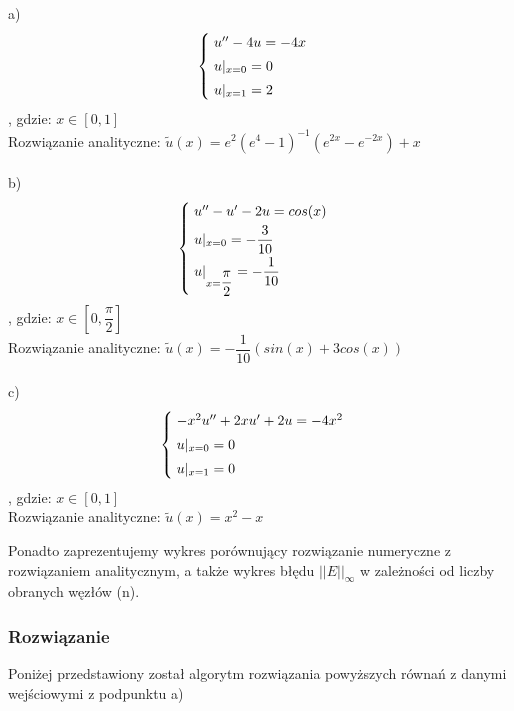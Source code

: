 a)
\[
\begin{cases}
\vspace{0.1cm} 
\hspace{0,1cm} u'' - 4u =-4x \\
\vspace{0.1cm}
\hspace{0,1cm}u|_{x=0} = 0 \\
\hspace{0,1cm}u|_{x=1} = 2
\end{cases}
\]
, gdzie:
$x\in[0,1]$
\\
Rozwiązanie analityczne: $\widetilde{u}(x) = e^2(e^4-1)^{-1} (e^{2x} - e^{-2x}) + x$
\\
\\
b)
\[
\begin{cases}
\vspace{0.1cm} 
\hspace{0,1cm} u'' -u'- 2u =cos(x) \\
\vspace{0.1cm}
\hspace{0,1cm}u|_{x=0} = -\dfrac{3}{10} \\
\hspace{0,1cm}u|_{x=\dfrac{\pi}{2}} = -\dfrac{1}{10}
\end{cases}
\]
, gdzie:
$x\in[0, \dfrac{\pi}{2}]$
\\
Rozwiązanie analityczne: $\widetilde{u}(x) = -\dfrac{1}{10}(sin(x) + 3cos(x))$
\\
\\
c)
\[
\begin{cases}
\vspace{0.1cm} 
\hspace{0,1cm} -x^2u'' +2xu' +2u=-4x^2 \\
\vspace{0.1cm}
\hspace{0,1cm}u|_{x=0} = 0 \\
\hspace{0,1cm}u|_{x=1} = 0
\end{cases}
\]
, gdzie:
$x\in[0,1]$
\\
Rozwiązanie analityczne: $\widetilde{u}(x) = x^2 - x$

\vspace{0.3cm}
Ponadto zaprezentujemy wykres porównujący rozwiązanie numeryczne z rozwiązaniem analitycznym, a także wykres błędu $||E||_{\infty}$ w zależności od liczby obranych węzłów (n).
\newpage
\subsubsection{Rozwiązanie}
Poniżej przedstawiony został algorytm rozwiązania powyższych równań z danymi wejściowymi z podpunktu a)




